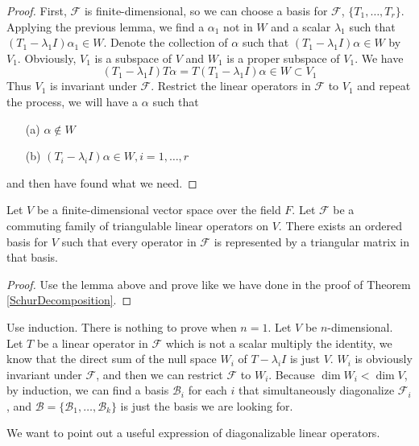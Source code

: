 \documentclass{article}
\begin{document}
\begin{proof}
	First, $\mathcal{F}$ is finite-dimensional, so we can choose a basis for $\mathcal{F}$, $\{T_1,\dots,T_r\}$. Applying the previous lemma, we find a $\alpha_1$ not in $W$ and a scalar $\lambda_1$ such that $(T_1-\lambda_1 I)\alpha_1\in W$. Denote the collection of $\alpha$ such that $(T_1-\lambda_1 I)\alpha\in W$ by $V_1$. Obviously, $V_1$ is a subspace of $V$ and $W_1$ is a proper subspace of $V_1$. We have
	\[(T_1-\lambda_1 I)T\alpha=T(T_1-\lambda_1 I)\alpha\in W\subset V_1\]
	Thus $V_1$ is invariant under $\mathcal{F}$. Restrict the linear operators in $\mathcal{F}$ to $V_1$ and repeat the process, we will have a $\alpha$ such that
	\begin{enumerate}
		\item [(a)]$\alpha\notin W$
		\item [(b)]$(T_i-\lambda_i I)\alpha\in W,i=1,\dots,r$
	\end{enumerate}
	and then have found what we need.
\end{proof}
\begin{thm}
	Let $V$ be a finite-dimensional vector space over the field $F$. Let $\mathcal{F}$ be a commuting family of triangulable linear operators on $V$. There exists an ordered basis for $V$ such that every operator in $\mathcal{F}$ is represented by a triangular matrix in that basis.
\end{thm}
\begin{proof}
	Use the lemma above and prove like we have done in the proof of Theorem \ref{SchurDecomposition}.
\end{proof}
\begin{thm}
	Use induction. There is nothing to prove when $n=1$. Let $V$ be $n$-dimensional. Let $T$ be a linear operator in $\mathcal{F}$ which is not a scalar multiply the identity, we know that the direct sum of the null space $W_i$ of $T-\lambda_i I$ is just $V$. $W_i$ is obviously invariant under $\mathcal{F}$, and then we can restrict $\mathcal{F}$ to $W_i$. Because $\dim W_i<\dim V$, by induction, we can find a basis $\mathcal{B}_i$ for each $i$ that simultaneously diagonalize $\mathcal{F}_i$, and $\mathcal{B}=\{\mathcal{B}_1,\dots,\mathcal{B}_k\}$ is just the basis we are looking for.
\end{thm}
We want to point out a useful expression of diagonalizable linear operators.
\end{document}
